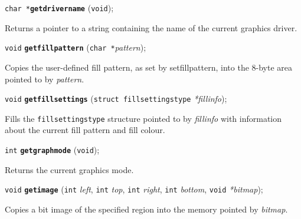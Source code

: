 \documentclass[a4paper,12pt]{article}
\newcommand{\V}{\texttt{void}}      %
\newcommand{\I}{\texttt{int}}       %
\newcommand{\C}{\texttt{char *}}    %
\newcommand{\func}[1]{\textbf{\texttt{#1}}}  %
\newcommand{\A}[1]{\emph{#1}}       %
\newenvironment{bgi}
{ %
  \begin{snugshade}
}
{ %
  \end{snugshade}
}
\begin{document}

\label{sec:getdrivername}

\begin{bgi}
\C{}\func{getdrivername} (\V{});
\end{bgi}

Returns a pointer to a string containing the name of the current
graphics driver.


\label{sec:getfillpattern}

\begin{bgi}
\V{} \func{getfillpattern} (\C{}\A{pattern});
\end{bgi}

Copies the user-defined fill pattern, as set by setfillpattern, into
the 8-byte area pointed to by \A{pattern}.


\label{sec:getfillsettings}

\begin{bgi}
\V{} \func{getfillsettings} (\texttt{struct fillsettingstype}
\A{*fillinfo});
\end{bgi}

Fills the \texttt{fillsettingstype} structure pointed to by
\A{fillinfo} with information about the current fill pattern and fill
colour.


\label{sec:getgraphmode}

\begin{bgi}
\I{} \func{getgraphmode} (\V{});
\end{bgi}

Returns the current graphics mode.


\label{sec:getimage}

\begin{bgi}
\V{} \func{getimage} (\I{} \A{left}, \I{} \A{top}, \I{} \A{right},
\I{} \A{bottom}, \V{} \A{*bitmap});
\end{bgi}

Copies a bit image of the specified region into the memory pointed by
\A{bitmap}.
\end{document}
